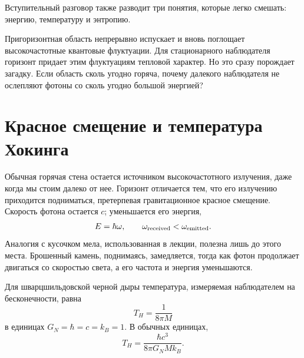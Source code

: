 Вступительный разговор также разводит три понятия, которые легко смешать: энергию, температуру и энтропию.

\begin{classroomqa}
\end{classroomqa}


Пригоризонтная область непрерывно испускает и вновь поглощает высокочастотные квантовые флуктуации. Для стационарного наблюдателя горизонт придает этим флуктуациям тепловой характер. Но это сразу порождает загадку. Если область сколь угодно горяча, почему далекого наблюдателя не ослепляют фотоны со сколь угодно большой энергией?

\section{Красное смещение и температура Хокинга}

Обычная горячая стена остается источником высокочастотного излучения, даже когда мы стоим далеко от нее. Горизонт отличается тем, что его излучению приходится подниматься, претерпевая гравитационное красное смещение. Скорость фотона остается \(c\); уменьшается его энергия,
\begin{equation}
E=\hbar\omega,
\qquad
\omega_{\rm received}<\omega_{\rm emitted}.
\end{equation}
Аналогия с кусочком мела, использованная в лекции, полезна лишь до этого места. Брошенный камень, поднимаясь, замедляется, тогда как фотон продолжает двигаться со скоростью света, а его частота и энергия уменьшаются.

Для шварцшильдовской черной дыры температура, измеряемая наблюдателем на бесконечности, равна
\begin{equation}
T_H=\frac{1}{8\pi M}
\label{eq:l09-hawking-natural}
\end{equation}
в единицах \(G_N=\hbar=c=k_B=1\). В обычных единицах,
\begin{equation}
T_H=\frac{\hbar c^3}{8\pi G_N M k_B}.
\label{eq:l09-hawking-full}
\end{equation}

